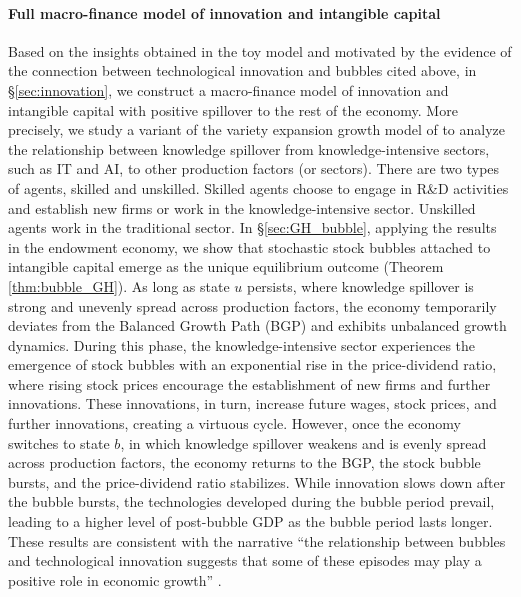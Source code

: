 \documentclass[a4paper,12pt]{article}
\numberwithin{equation}{section}
\theoremstyle{plain}
\begin{document}
\paragraph{Full macro-finance model of innovation and intangible capital}
Based on the insights obtained in the toy model and motivated by the evidence of the connection between technological innovation and bubbles cited above, in \S\ref{sec:innovation}, we construct a macro-finance model of innovation and intangible capital with positive spillover to the rest of the economy. More precisely, we study a variant of the variety expansion growth model of \citet[Ch.~3]{GrossmanHelpman1991book} to analyze the relationship between knowledge spillover from knowledge-intensive sectors, such as IT and AI, to other production factors (or sectors). There are two types of agents, skilled and unskilled. Skilled agents choose to engage in R\&D activities and establish new firms or work in the knowledge-intensive sector. Unskilled agents work in the traditional sector. In \S\ref{sec:GH_bubble}, applying the results in the endowment economy, we show that stochastic stock bubbles attached to intangible capital emerge as the unique equilibrium outcome (Theorem \ref{thm:bubble_GH}). As long as state $u$ persists, where knowledge spillover is strong and unevenly spread across production factors, the economy temporarily deviates from the Balanced Growth Path (BGP) and exhibits unbalanced growth dynamics. During this phase, the knowledge-intensive sector experiences the emergence of stock bubbles with an exponential rise in the price-dividend ratio, where rising stock prices encourage the establishment of new firms and further innovations. These innovations, in turn, increase future wages, stock prices, and further innovations, creating a virtuous cycle. However, once the economy switches to state $b$, in which knowledge spillover weakens and is evenly spread across production factors, the economy returns to the BGP, the stock bubble bursts, and the price-dividend ratio stabilizes. While innovation slows down after the bubble bursts, the technologies developed during the bubble period prevail, leading to a higher level of post-bubble GDP as the bubble period lasts longer. These results are consistent with the narrative ``the relationship between bubbles and technological innovation suggests that some of these episodes may play a positive role in economic growth'' \citep[p.~40]{Scheinkman2014}. 
\end{document}
